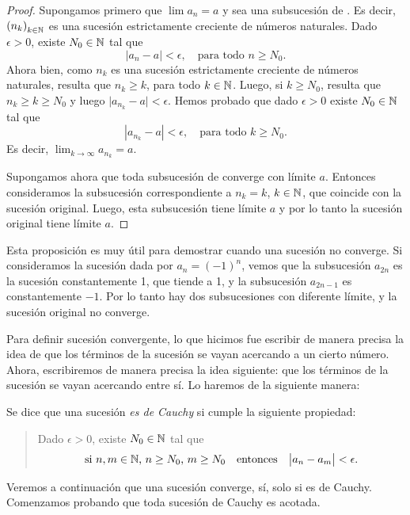 \begin{proof}
Supongamos primero que $\lim a_n = a$ y sea \subsucan una subsucesión de \sucan. Es decir, $\left(n_k\right)_{k\in\mathbb{N}}$ es una sucesión estrictamente creciente de números naturales.
Dado $\epsilon > 0$, existe $N_0\in\mathbb{N}$ tal que 
\[
|a_n - a| < \epsilon, \quad\text{para todo $n\ge N_0$}.
\]
Ahora bien, como $n_k$ es una sucesión estrictamente creciente de números naturales, resulta que $n_k \ge k$, para todo $k\in\mathbb{N}$. Luego, si $k \ge N_0$, resulta que $n_k \ge k \ge N_0$ y luego $\big|a_{n_k} - a \big| < \epsilon$. Hemos probado que dado $\epsilon>0$ existe $N_0\in\mathbb{N}$ tal que 
\[
|a_{n_k} - a| < \epsilon, \quad\text{para todo $k\ge N_0$}.
\]
Es decir, $\lim_{k\to\infty} a_{n_k} = a$.

Supongamos ahora que toda subsucesión de \sucan converge con límite $a$. Entonces consideramos la subsucesión correspondiente a $n_k = k$, $k\in\mathbb{N}$, que coincide con la sucesión original.
Luego, esta subsucesión tiene límite $a$ y por lo tanto la sucesión original tiene límite $a$.
\end{proof}

Esta proposición es muy útil para demostrar cuando una sucesión no converge.
Si consideramos la sucesión \sucan dada por $a_n = (-1)^n$, vemos que la subsucesión $a_{2n}$ es la sucesión constantemente 1, que tiende a 1, y la subsucesión $a_{2n-1}$ es constantemente $-1$. Por lo tanto hay dos subsucesiones con diferente límite, y la sucesión original no converge.

Para definir sucesión convergente, lo que hicimos fue escribir de manera precisa la idea de que los términos de la sucesión se vayan acercando a un cierto número. Ahora, escribiremos de manera precisa la idea siguiente: que los términos de la sucesión se vayan acercando entre sí. Lo haremos de la siguiente manera:

\begin{definition}
    Se dice que una sucesión \emph{es de Cauchy} si cumple la siguiente propiedad:
    \begin{quote}
        Dado $\epsilon > 0$, existe $N_0 \in\mathbb{N}$ tal que
        \[
        \text{si $n,m\in\mathbb{N}$, $n\ge N_0$, $m\ge N_0$} \quad\text{entonces}\quad
        \big| a_n - a_m \big| < \epsilon.
        \]
    \end{quote}
\end{definition}

Veremos a continuación que una sucesión converge, sí, solo si es de Cauchy.
Comenzamos probando que toda sucesión de Cauchy es acotada.

